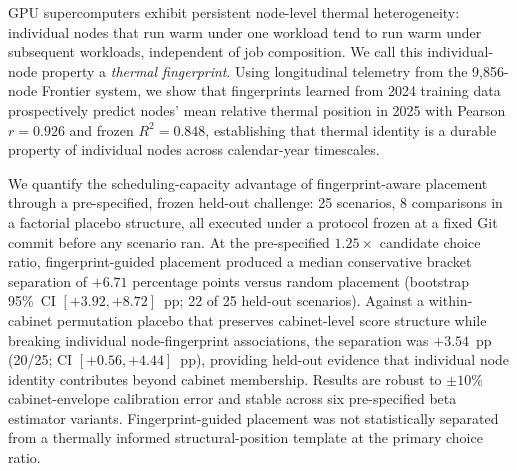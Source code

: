 
GPU supercomputers exhibit persistent node-level thermal heterogeneity:
individual nodes that run warm under one workload tend to run warm under
subsequent workloads, independent of job composition.
We call this individual-node property a \emph{thermal fingerprint}.
Using longitudinal telemetry from the 9{,}856-node Frontier system, we show
that fingerprints learned from 2024 training data prospectively predict nodes'
mean relative thermal position in 2025 with Pearson $r = 0.926$
and frozen $R^2 = 0.848$,
establishing that thermal identity is a durable property of individual nodes
across calendar-year timescales.

We quantify the scheduling-capacity advantage of fingerprint-aware placement
through a pre-specified, frozen held-out challenge: 25 scenarios, 8 comparisons in a
factorial placebo structure, all executed under a protocol frozen at a fixed
Git commit before any scenario ran.
At the pre-specified $1.25{\times}$ candidate choice ratio, fingerprint-guided
placement produced a median conservative bracket separation of
$+6.71$ percentage points versus random placement
(bootstrap 95\%~CI $[{+}3.92, {+}8.72]$~pp; 22 of 25 held-out scenarios).
Against a within-cabinet permutation placebo that preserves cabinet-level score
structure while breaking individual node-fingerprint associations, the
separation was $+3.54$~pp (20/25; CI $[{+}0.56, {+}4.44]$~pp),
providing held-out evidence that individual node identity contributes beyond
cabinet membership.
Results are robust to $\pm10\%$ cabinet-envelope calibration error
and stable across six pre-specified beta estimator variants.
Fingerprint-guided placement was not statistically separated from a thermally
informed structural-position template at the primary choice ratio.
